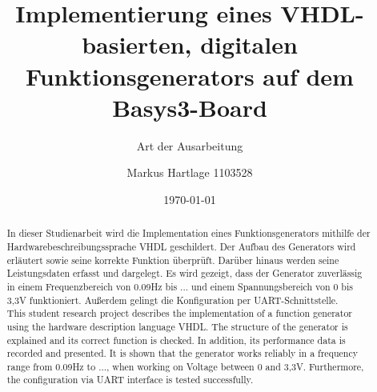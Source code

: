 \documentclass[BCOR=1cm, twoside, ngerman]{scrreprt}
\title{Implementierung eines VHDL-basierten, digitalen Funktionsgenerators auf dem Basys3-Board}
\subtitle{Art der Ausarbeitung}
\author{Markus Hartlage 1103528}
\date{\today} %
\begin{document}
\maketitle

\begin{abstract}
  In dieser Studienarbeit wird die Implementation eines Funktionsgenerators mithilfe der Hardwarebeschreibungssprache VHDL geschildert.
  Der Aufbau des Generators wird erläutert sowie seine korrekte Funktion überprüft.
  Darüber hinaus werden seine Leistungsdaten erfasst und dargelegt.
  Es wird gezeigt, dass der Generator zuverlässig in einem Frequenzbereich von 0.09Hz bis ... und einem Spannungsbereich von 0 bis 3,3V funktioniert. Außerdem gelingt die Konfiguration per UART-Schnittstelle.\\

  This student research project describes the implementation of a function generator using the hardware description language VHDL.
  The structure of the generator is explained and its correct function is checked.
  In addition, its performance data is recorded and presented.
  It is shown that the generator works reliably in a frequency range from 0.09Hz to ..., when working on Voltage between 0 and 3,3V. Furthermore, the configuration via UART interface is tested successfully.

\end{abstract}

\tableofcontents
\printbibliography[heading=bibintoc, title={Literaturverzeichnis}]





\end{document}
